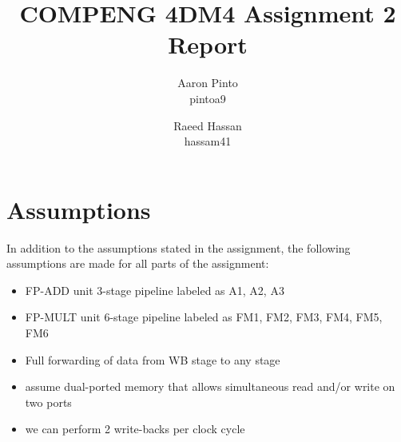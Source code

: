 \documentclass[12pt]{article}
\title{COMPENG 4DM4 Assignment 2 Report}
\author{
    Aaron Pinto \\
    pintoa9 \\
    \and
    Raeed Hassan \\
    hassam41 \\
}
\begin{document}
\maketitle
\clearpage

\section*{Assumptions}
In addition to the assumptions stated in the assignment, the following assumptions are made for all parts of the assignment:
\begin{itemize}
    \item FP-ADD unit 3-stage pipeline labeled as A1, A2, A3
    \item FP-MULT unit 6-stage pipeline labeled as FM1, FM2, FM3, FM4, FM5, FM6
    \item Full forwarding of data from WB stage to any stage
	\item assume dual-ported memory that allows simultaneous read and/or write on two ports
	\item we can perform 2 write-backs per clock cycle
\end{itemize}










\end{document}
